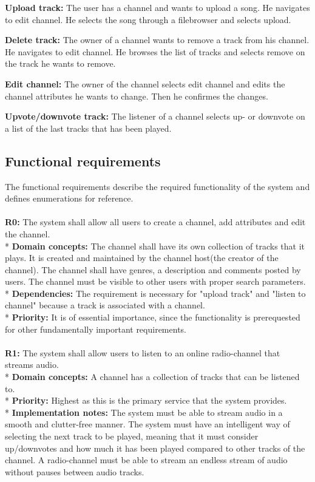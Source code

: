 \documentclass[a4paper,11pt,report]{article}
\begin{document}
\textbf{Upload track:}
The user has a channel and wants to upload a song. He navigates to edit channel. He selects the song through a filebrowser and selects upload.

\textbf{Delete track:}
The owner of a channel wants to remove a track from his channel. He navigates to edit channel. He browses the list of tracks and selects remove on the track he wants to remove.

\textbf{Edit channel:}
The owner of the channel selects edit channel and edits the channel attributes he wants to change. Then he confirmes the changes.

\textbf{Upvote/downvote track:}
The listener of a channel selects up- or downvote on a list of the last tracks that has been played.

\subsection{Functional requirements}
The functional requirements describe the required functionality of the system and defines enumerations for reference.
\\ \\
\textbf{R0:}
The system shall allow all users to create a channel, add attributes and edit the channel. \\*
\textbf{Domain concepts:}
The channel shall have its own collection of tracks that it plays. It is created and maintained by the channel host(the creator of the channel).
The channel shall have genres, a description and comments posted by users.
The channel must be visible to other users with proper search parameters. \\*
\textbf{Dependencies:} 
The requirement is necessary for "upload track" and "listen to channel" because a track is associated with a channel. \\*
\textbf{Priority:} 
It is of essential importance, since the functionality is prerequested for other fundamentally important requirements.
\\ \\

\textbf{R1:}
The system shall allow users to listen to an online radio-channel that streams audio. \\*
\textbf{Domain concepts:}
A channel has a collection of tracks that can be listened to. \\*
\textbf{Priority:}
Highest as this is the primary service that the system provides. \\*
\textbf{Implementation notes:}
The system must be able to stream audio in a smooth and clutter-free manner. The system must have an intelligent way of selecting the next track to be played, meaning that it must consider up/downvotes and how much it has been played compared to other tracks of the channel.
A radio-channel must be able to stream an endless stream of audio without pauses between audio tracks.
\\ \\
\end{document}
